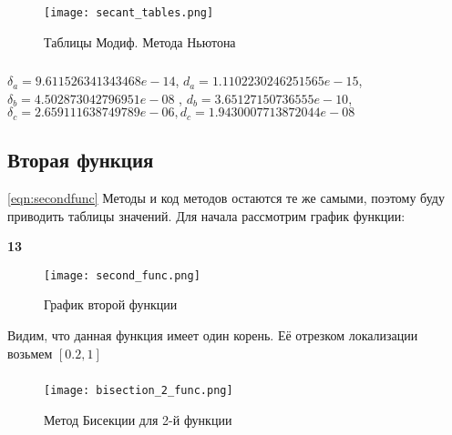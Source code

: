 \documentclass[a4paper,12pt]{article}
\begin{document}
\begin{figure}[h]
    \centering
    \texttt{[image: secant\_tables.png]}
    \caption{Таблицы Модиф. Метода Ньютона}
    \label{mod_newton_tables}
\end{figure}


\subsubsection{}
$\delta_a = 9.611526341343468e-14$, $d_a = 1.1102230246251565e-15$, $\delta_b = 4.502873042796951e-08$ , $d_b = 3.65127150736555e-10$, $\delta_c = 2.659111638749789e-06, d_c = 1.9430007713872044e-08$



\subsection{Вторая функция} \ref{eqn:secondfunc}
Методы и код методов остаются те же самыми, поэтому буду приводить таблицы значений. Для начала рассмотрим график функции:


\begin{center}
{\bf13}\\
\vspace{0.5cm}
\end{center}
\setcounter{page}{13}

\begin{figure}[h]
    \centering
    \texttt{[image: second\_func.png]}
    \caption{График второй функции}
    \label{second_func_graph}
\end{figure}

Видим, что данная функция имеет один корень. Её отрезком локализации возьмем $[0.2, 1]$



\subsubsection{}

\begin{figure}[h]
    \centering
    \texttt{[image: bisection\_2\_func.png]}
    \caption{Метод Бисекции для 2-й функции}
    \label{second_func_bisection}
\end{figure}


\subsubsection{}
\end{document}
